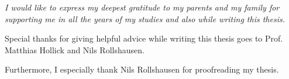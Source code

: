 
\bigskip

\begingroup
\let\clearpage\relax
\let\cleardoublepage\relax
\let\cleardoublepage\relax

{\slshape 
I would like to express my deepest gratitude to my parents and my family for supporting me in all the years of my studies and also while writing this thesis.

\bigskip

Special thanks for giving helpful advice while writing this thesis goes to Prof. Matthias Hollick and Nils Rollshausen.

\bigskip

Furthermore, I especially thank Nils Rollshausen for proofreading my thesis.
}

\endgroup
